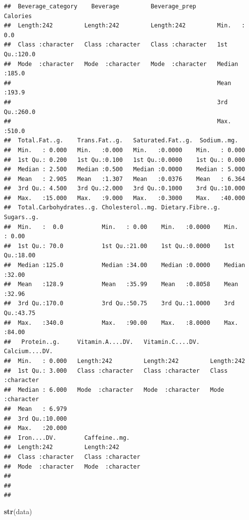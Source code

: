 \documentclass[
]{article}
\newenvironment{Shaded}{\begin{snugshade}}{\end{snugshade}}
\newcommand{\FunctionTok}[1]{\textcolor[rgb]{0.13,0.29,0.53}{\textbf{#1}}}
\newcommand{\NormalTok}[1]{#1}
\begin{document}
\begin{verbatim}
##  Beverage_category    Beverage         Beverage_prep         Calories    
##  Length:242         Length:242         Length:242         Min.   :  0.0  
##  Class :character   Class :character   Class :character   1st Qu.:120.0  
##  Mode  :character   Mode  :character   Mode  :character   Median :185.0  
##                                                           Mean   :193.9  
##                                                           3rd Qu.:260.0  
##                                                           Max.   :510.0  
##  Total.Fat..g.    Trans.Fat..g.   Saturated.Fat..g.  Sodium..mg.    
##  Min.   : 0.000   Min.   :0.000   Min.   :0.0000    Min.   : 0.000  
##  1st Qu.: 0.200   1st Qu.:0.100   1st Qu.:0.0000    1st Qu.: 0.000  
##  Median : 2.500   Median :0.500   Median :0.0000    Median : 5.000  
##  Mean   : 2.905   Mean   :1.307   Mean   :0.0376    Mean   : 6.364  
##  3rd Qu.: 4.500   3rd Qu.:2.000   3rd Qu.:0.1000    3rd Qu.:10.000  
##  Max.   :15.000   Max.   :9.000   Max.   :0.3000    Max.   :40.000  
##  Total.Carbohydrates..g. Cholesterol..mg. Dietary.Fibre..g.   Sugars..g.   
##  Min.   :  0.0           Min.   : 0.00    Min.   :0.0000    Min.   : 0.00  
##  1st Qu.: 70.0           1st Qu.:21.00    1st Qu.:0.0000    1st Qu.:18.00  
##  Median :125.0           Median :34.00    Median :0.0000    Median :32.00  
##  Mean   :128.9           Mean   :35.99    Mean   :0.8058    Mean   :32.96  
##  3rd Qu.:170.0           3rd Qu.:50.75    3rd Qu.:1.0000    3rd Qu.:43.75  
##  Max.   :340.0           Max.   :90.00    Max.   :8.0000    Max.   :84.00  
##   Protein..g.     Vitamin.A....DV.   Vitamin.C....DV.   Calcium....DV.    
##  Min.   : 0.000   Length:242         Length:242         Length:242        
##  1st Qu.: 3.000   Class :character   Class :character   Class :character  
##  Median : 6.000   Mode  :character   Mode  :character   Mode  :character  
##  Mean   : 6.979                                                           
##  3rd Qu.:10.000                                                           
##  Max.   :20.000                                                           
##  Iron....DV.        Caffeine..mg.     
##  Length:242         Length:242        
##  Class :character   Class :character  
##  Mode  :character   Mode  :character  
##                                       
##                                       
## 
\end{verbatim}

\begin{Shaded}
\begin{Highlighting}[]
\FunctionTok{str}\NormalTok{(data)}
\end{Highlighting}
\end{Shaded}
\end{document}
